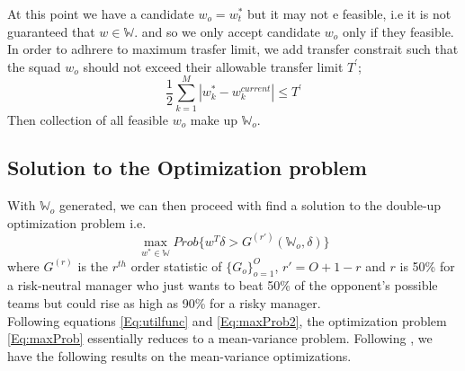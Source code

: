 \documentclass[12pt,oneside,a4paper]{book}
\theoremstyle{definition}
\theoremstyle{remark}
\begin{document}
				At this point we have a candidate $w_o = w^*_t$ but it may not e feasible, i.e it is not guaranteed that $w \in \mathbb{W}$. and so we only accept candidate $w_o$ only if they feasible. In order to adhrere to maximum trasfer limit, we add transfer constrait such that the squad $w_o$ should not exceed their allowable transfer limit $T^{'}$;
				$$
					\frac{1}{2} \sum_{k=1}^{M}\left| w^*_{k}-w^{current}_{k} \right| \leqslant T^{'}
				$$
				Then collection of all feasible $w_o$ make up $\mathbb{W}_o$.

				\subsection{Solution to the Optimization problem}
				With $\mathbb{W}_o$ generated, we can then proceed with find a solution to the double-up optimization problem i.e.\\
				\begin{equation}\label{Eq:maxProb}
					\max_{w^*\in\mathbb{W}}Prob\{w^T\delta > G^{(r')}(\mathbb{W}_o, \delta)\}
				\end{equation}
				where $G^{(r)}$ is the $r^{th}$ order statistic of $\{G_o\}_{o=1}^O$, $r' = O + 1 - r$ and $r$ is 50\% for a risk-neutral manager who just wants to beat 50\% of the opponent’s possible teams but could rise as high as 90\% for a risky manager.\\
				Following equations \ref{Eq:utilfunc} and \ref{Eq:maxProb2}, the optimization problem \ref{Eq:maxProb} essentially reduces to a mean-variance problem. Following \cite{morton2003optimizing}, we have the following results on the mean-variance optimizations.
\end{document}
